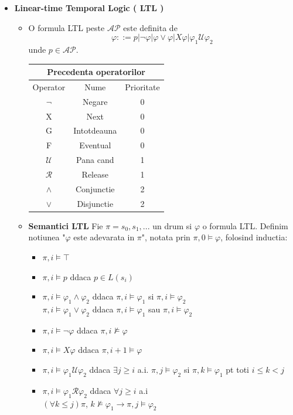 \documentclass[10pt,a4paper,twocolumn]{report}
\begin{document}
\begin{itemize}
\item \textbf{Linear-time Temporal Logic ( LTL )}
	\begin{itemize}
	\item O formula LTL peste $\mathcal{AP}$ este definita de
	\[\varphi ::= p | \neg \varphi | \varphi \vee \varphi | X \varphi | \varphi_1 \mathcal{U} \varphi_2 \] unde $p \in \mathcal{AP}$.\\
	\hfill
	\break
	\begin{tabular}{|c|c|c|}
	\hline 
	\multicolumn{3}{|c|}{Precedenta operatorilor} \\ 
	\hline 
	Operator & Nume & Prioritate \\ 
	\hline 
	$\neg$ & Negare & 0 \\ 
	X & Next & 0 \\ 
	G & Intotdeauna & 0 \\ 
	F & Eventual & 0 \\ 
	\hline 
	$\mathcal{U}$ & Pana cand & 1 \\ 
	$\mathcal{R}$ & Release & 1 \\ 
	\hline 
	$\wedge$ & Conjunctie & 2 \\ 
	$\vee$ & Disjunctie & 2 \\ 
	\hline 
	\end{tabular}
	\hfill
	\break
	\item \textbf{Semantici LTL}
	Fie $\pi = s_0, s_1, ...$ un drum si $\varphi$ o formula LTL. Definim notiunea "$\varphi$ este adevarata in $\pi$", notata prin $\pi,0 \models \varphi$, folosind inductia:
		\begin{itemize}
		\item $\pi,i \models \top$
		\item $\pi,i \models p$ ddaca $p \in L(s_i)$
		\item $\pi,i \models \varphi_1 \wedge \varphi_2$ ddaca $\pi,i \models \varphi_1$ si $\pi,i \models \varphi_2$ \\ $\pi,i \models \varphi_1 \vee \varphi_2$ ddaca $\pi,i \models \varphi_1$ sau $\pi,i \models \varphi_2$
		\item $\pi,i \models \neg \varphi$ ddaca $\pi,i \not \models \varphi$
		\item $\pi,i \models X\varphi$ ddaca $\pi,i+1 \models \varphi$
		\item $\pi,i \models \varphi_1 \mathcal{U} \varphi_2$ ddaca $\exists j \geq i$ a.i. $\pi,j \models \varphi_2$ si $\pi,k \models \varphi_1$ pt toti $i \leq k < j$
		\item $\pi,i \models \varphi_1 \mathcal{R} \varphi_2$ ddaca $\forall j \geq i$ a.i\\$(\forall k \leq j)\pi$, $k\not\models\varphi_1 \rightarrow \pi,j \models \varphi_2$

\end{itemize}
\end{itemize}
\end{itemize}
\end{document}
